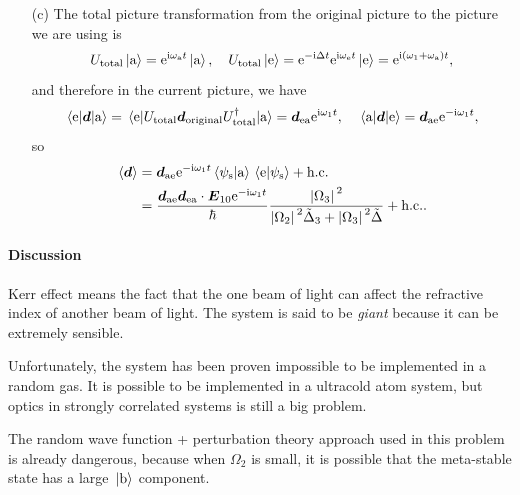 \documentclass[hyperref, a4paper]{article}
\newcommand*{\ii}{\mathrm{i}}
\newcommand*{\ee}{\mathrm{e}}
\begin{document}
\begin{itemize}
\item[(c)] The total picture transformation from the original picture to the picture we are using is 
\begin{equation}
    U_\text{total} \ket*{\text{a}} = \ee^{\ii \omega_\text{a} t} \ket*{\text{a}}, \quad 
    U_\text{total} \ket*{\text{e}} = \ee^{- \ii \Delta t} \ee^{\ii \omega_\text{e} t} \ket*{\text{e}} = \ee^{\ii (\omega_1 + \omega_\text{a}) t} ,
\end{equation} 
and therefore in the current picture, we have 
\[
    \mel{\text{e}}{\vb*{d}}{\text{a}} = \mel{\text{e}}{U_\text{total} \vb*{d}_\text{original} U_\text{total}^\dagger }{\text{a}} = \vb*{d}_\text{ea} \ee^{\ii \omega_1 t}, \quad \mel{\text{a}}{\vb*{d}}{\text{e}} = \vb*{d}_\text{ae}  \ee^{- \ii \omega_1 t},
\]
so
\begin{equation}
    \begin{aligned}
        \expval*{\vb*{d}} &= \vb*{d}_\text{ae} \ee^{- \ii \omega_1 t} \braket*{\psi_\text{s}}{\text{a}} \braket*{\text{e}}{\psi_\text{s}} + \text{h.c.} \\
        &= \frac{\vb*{d}_\text{ae} \vb*{d}_\text{ea} \cdot \vb*{E}_{10} \ee^{- \ii \omega_1 t} }{\hbar} 
        \frac{\abs*{\Omega_3}^2}{\abs*{\Omega_2}^2 \tilde{\Delta}_3 + \abs*{\Omega_3}^2 \tilde{\Delta}} + \text{h.c.}.
    \end{aligned}
\end{equation}

\end{itemize}

\paragraph{Discussion} Kerr effect means the fact that the one beam of light can affect the refractive index 
of another beam of light. The system is said to be \emph{giant} because it can be extremely sensible.

Unfortunately, the system  has been proven impossible to be implemented in a random gas.
It is possible to be implemented in a ultracold atom system, but optics in strongly correlated systems is still
a big problem. 

The random wave function + perturbation theory approach used in this problem is already dangerous, because when 
$\Omega_2$ is small, it is possible that the meta-stable state has a large $\ket*{\text{b}}$ component.

\paragraph{}
\end{document}
